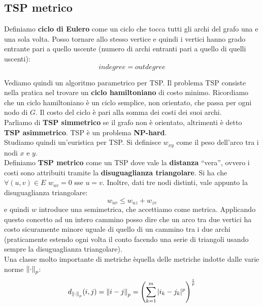 														\subsection{TSP metrico}
														\begin{definizione}
															Definiamo \textbf{ciclo di Eulero} come un ciclo che tocca tutti gli archi
															del grafo una e una sola volta. Posso tornare allo stesso vertice e quindi i
															vertici hanno grado entrante pari a quello uscente (numero di archi entranti
															pari a quello di quelli uscenti):
															\[indegree=outdegree\]
														\end{definizione}
														Vediamo quindi un algoritmo parametrico per TSP. Il problema TSP consiste nella
														pratica nel trovare un \textbf{ciclo hamiltoniano} di costo minimo. Ricordiamo
														che un ciclo hamiltoniano è un ciclo semplice, non orientato, che passa per ogni
														nodo di $G$. Il costo del ciclo è pari alla somma dei costi dei suoi archi.\\ 
														Parliamo di \textbf{TSP simmetrico} se il grafo non è orientato, altrimenti è
														detto \textbf{TSP asimmetrico}. TSP è un problema \textbf{NP-hard}.\\
														Studiamo quindi un'euristica per TSP. Si definisce $w_{xy}$ come il peso
														dell'arco tra i nodi $x$ e $y$.\\
														Definiamo \textbf{TSP metrico} come un TSP dove vale la \textbf{distanza}
														``vera'', ovvero i costi sono attribuiti tramite la \textbf{disuguaglianza
															triangolare}. Si ha che $\forall(u,v)\in E$ $w_{uv}=0$ sse $u=v$. Inoltre,
														dati tre nodi distinti, vale appunto la disuguaglianza triangolare:
														\[w_{uv}\leq w_{uz}+w_{zv}\]
														e quindi $w$ introduce una semimetrica, che accettiamo come metrica.
														Applicando questo concetto ad un intero cammino posso dire che un arco tra due
														vertici ha costo sicuramente minore uguale di quello di un cammino tra i due
														archi (praticamente estendo ogni volta il conto facendo una serie di triangoli
														usando sempre la disuguaglianza triangolare).\\
														Una classe molto importante di metriche èquella delle metriche indotte dalle
														varie norme $\norm{\cdot}_p$:
														\[d_{\norm{\cdot}_p}(i,j)=\norm{i-j}_p=\left(\sum_{k=1}^m
															|i_k-j_k|^p\right)^{\frac{1}{p}}\]
